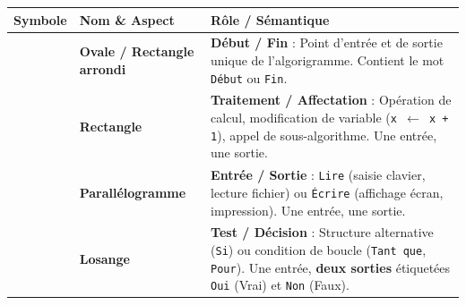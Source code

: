 \documentclass[11pt]{article}
\begin{document}
\begin{propriete}
\begin{center}
\begin{tabularx}{\linewidth}{|l|X|X|}
\hline
\rowcolor{popblueL} \textbf{Symbole} & \textbf{Nom \& Aspect} & \textbf{Rôle / Sémantique} \\
\hline
\begin{tikzpicture}[baseline=-0.5ex]\node[startstop, minimum width=1.2cm, minimum height=0.5cm] {};\end{tikzpicture} & \textbf{Ovale / Rectangle arrondi} & \textbf{Début / Fin} : Point d'entrée et de sortie unique de l'algorigramme. Contient le mot \texttt{Début} ou \texttt{Fin}. \\
\hline
\begin{tikzpicture}[baseline=-0.5ex]\node[process, minimum width=1.2cm, minimum height=0.5cm] {};\end{tikzpicture} & \textbf{Rectangle} & \textbf{Traitement / Affectation} : Opération de calcul, modification de variable (\texttt{x $\leftarrow$ x + 1}), appel de sous-algorithme. Une entrée, une sortie. \\
\hline
\begin{tikzpicture}[baseline=-0.5ex]\node[io, minimum width=1.2cm, minimum height=0.5cm] {};\end{tikzpicture} & \textbf{Parallélogramme} & \textbf{Entrée / Sortie} : \texttt{Lire} (saisie clavier, lecture fichier) ou \texttt{Écrire} (affichage écran, impression). Une entrée, une sortie. \\
\hline
\begin{tikzpicture}[baseline=-0.5ex]\node[decision, minimum width=1cm, minimum height=0.5cm] {};\end{tikzpicture} & \textbf{Losange} & \textbf{Test / Décision} : Structure alternative (\texttt{Si}) ou condition de boucle (\texttt{Tant que}, \texttt{Pour}). Une entrée, \textbf{deux sorties} étiquetées \texttt{Oui} (Vrai) et \texttt{Non} (Faux). \\

\end{tabularx}
\end{center}
\end{propriete}
\end{document}
